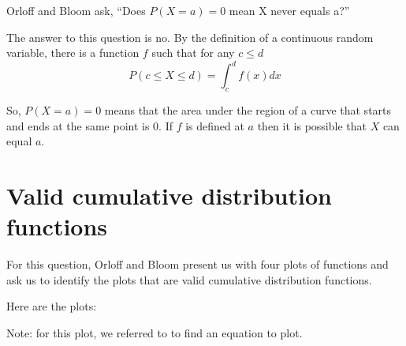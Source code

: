 \documentclass[a4paper,11pt]{article}
\begin{document}
Orloff and Bloom ask, ``Does $P \left(X = a \right) = 0$ mean X never equals
a?''

The answer to this question is no.  By the definition of a continuous random
variable, there is a function $f$ such that for any $c \leq d$
\begin{equation}
  P \left( c \leq X \leq d \right) = \int_{c}^{d} f \left(x \right) dx
\end{equation}

So, $P \left(X = a \right) = 0$ means that the area under the region of a curve
that starts and ends at the same point is 0. If $f$ is defined at $a$ then
it is possible that $X$ can equal $a$.

\section{Valid cumulative distribution functions}
For this question, Orloff and Bloom present us with four plots of functions
and ask us to identify the plots that are valid cumulative distribution
functions.

Here are the plots:


Note: for this plot, we referred to \cite{sigmoid} to find an equation to
plot.




\newcommand\gauss[2]{1/(#2*sqrt(2*pi))*exp(-((x-#1)^2)/(2*#2^2))}

\end{document}
